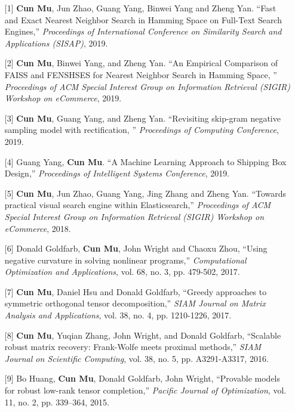 \documentclass[11pt,a4paper,roman]{moderncv} %
\begin{document}
\vspace*{1mm}
\begin{enumerate}
\item[{[1]}] {\bfseries Cun Mu}, Jun Zhao, Guang Yang, Binwei Yang and Zheng Yan. ``Fast and Exact Nearest Neighbor Search in Hamming Space on Full-Text Search Engines,'' {\em Proceedings of International Conference on Similarity Search and Applications (SISAP)}, 2019.
\item[{[2]}] {\bfseries Cun Mu}, Binwei Yang, and Zheng Yan. ``An Empirical Comparison of FAISS and FENSHSES for Nearest Neighbor Search in Hamming Space, '' {\em Proceedings of ACM Special Interest Group on Information Retrieval (SIGIR) Workshop on eCommerce}, 2019.
\item[{[3]}] {\bfseries Cun Mu}, Guang Yang, and Zheng Yan. ``Revisiting skip-gram negative sampling model with rectification, '' {\em Proceedings of Computing Conference}, 2019.	
\item[{[4]}] Guang Yang, {\bfseries Cun Mu}. ``A Machine Learning Approach to Shipping Box Design,'' {\em Proceedings of Intelligent Systems Conference}, 2019.
\vspace*{2mm}
\item[{[5]}] {\bfseries Cun Mu}, Jun Zhao, Guang Yang, Jing Zhang and Zheng Yan. ``Towards practical visual search engine within Elasticsearch,'' {\em Proceedings of ACM Special Interest Group on Information Retrieval (SIGIR) Workshop on eCommerce}, 2018.
\vspace*{2mm}
\item[{[6]}] Donald Goldfarb, {\bfseries Cun Mu}, John Wright and Chaoxu Zhou, ``Using negative curvature in solving nonlinear programs,'' {\em Computational Optimization and Applications}, vol. 68, no. 3, pp. 479-502, 2017.
\vspace*{2mm}
\item[{[7]}] {\bfseries Cun Mu}, Daniel Hsu and Donald Goldfarb, ``Greedy approaches to symmetric orthogonal tensor decomposition,'' {\em SIAM Journal on Matrix Analysis and Applications}, vol. 38, no. 4, pp. 1210-1226, 2017.
\vspace*{2mm}
\item[{[8]}] {\bfseries Cun Mu}, Yuqian Zhang, John Wright, and Donald Goldfarb, ``Scalable robust matrix recovery: Frank-Wolfe meets proximal methods,'' {\em SIAM Journal on Scientific Computing}, vol. 38, no. 5, pp.  A3291-A3317, 2016. 
\vspace*{2mm}
\item[{[9]}] Bo Huang, {\bfseries Cun Mu}, Donald Goldfarb, John Wright, ``Provable models for robust low-rank tensor completion,'' {\em Pacific Journal of Optimization}, vol. 11,  no. 2, pp. 339--364, 2015.

\end{enumerate}
\end{document}
